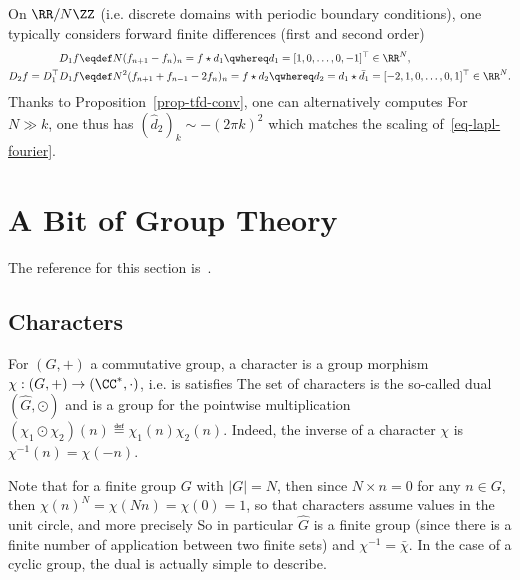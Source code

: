 On $\RR/N\ZZ$ (i.e. discrete domains with periodic boundary conditions), one typically considers forward finite differences (first and second order)
\begin{align}\label{eq-disc-diff-1}
	D_1 f &\eqdef N (f_{n+1}-f_n)_n = f \star d_1 \qwhereq d_1 = [1,0,\ldots,0,-1]^\top \in \RR^N, \\
	\label{eq-disc-diff-2}
	D_2 f = D_1^\top D_1 f & \eqdef N^2 (f_{n+1}+f_{n-1}-2f_n)_n = f \star d_2 \qwhereq d_2 = d_1 \star \bar d_1 = [-2,1,0,\ldots,0,1]^\top \in \RR^N.
\end{align}
Thanks to Proposition~\ref{prop-tfd-conv}, one can alternatively computes
For $N \gg k$, one thus has $(\hat d_2)_k \sim -(2\pi k)^2$ which matches the scaling of~\eqref{eq-lapl-fourier}. 


\section{A Bit of Group Theory}

The reference for this section is~\cite{peyre2004algebre}.

\subsection{Characters}

For $(G,+)$ a commutative group, a character is a group morphism $\chi : (G,+) \rightarrow (\CC^*,\cdot)$, i.e. is satisfies
The set of characters is the so-called dual $(\hat G,\odot)$ and is a group for the pointwise multiplication $(\chi_1 \odot \chi_2)(n) \eqdef \chi_1(n) \chi_2(n)$.  Indeed, the inverse of a character $\chi$ is $\chi^{-1}(n)=\chi(-n)$.

Note that for a finite group $G$ with $|G|=N$, then since $N \times n=0$ for any $n \in G$, then $\chi(n)^N=\chi(N n)=\chi(0)=1$, so that characters assume values in the unit circle, and more precisely
So in particular $\hat G$ is a finite group (since there is a finite number of application between two finite sets) and $\chi^{-1}=\bar\chi$. In the case of a cyclic group, the dual is actually simple to describe.

